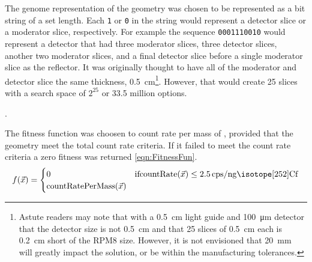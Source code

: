 The genome representation of the geometry was chosen to be represented as a bit string of a set length.
Each \verb+1+ or \verb+0+ in the string would represent a detector slice or a moderator slice, respectively.
For example the sequence \verb+0001110010+ would represent a detector that had three moderator slices, three detector slices, another two moderator slices, and a final detector slice before a single moderator slice as the reflector.
It was originally thought to have all of the moderator and detector slice the same thickness, \SI{0.5}{\centi \meter}\footnote{Astute readers may note that with a \SI{0.5}{\centi \meter} light guide and \SI{100}{\micro \meter} detector that the detector size is not \SI{0.5}{\centi\meter} and that 25 slices of \SI{0.5}{\centi\meter} each is \SI{0.2}{\centi\meter} short of the RPM8 size. However, it is not envisioned that \SI{20}{\milli\meter} will greatly impact the solution, or be within the manufacturing tolerances. }.
However, that would create 25 slices with a search space of $2^{25}$ or 33.5 million options.

.

The fitness function was choosen to count rate per mass of , provided that the geometry meet the total count rate criteria.
If it failed to meet the count rate criteria a zero fitness was returned \eqref{eqn:FitnessFun}.
\begin{align}
    \label{eqn:FitnessFun}
    f(\vec{x})
    = \begin{cases}
    0 & \text{if} \text{countRate}(\vec{x}) \leq \SI{2.5}{cps\per\nano\gram\iso[252]{Cf}} \\
    \text{countRatePerMass}(\vec{x})
    \end{cases}
\end{align}

